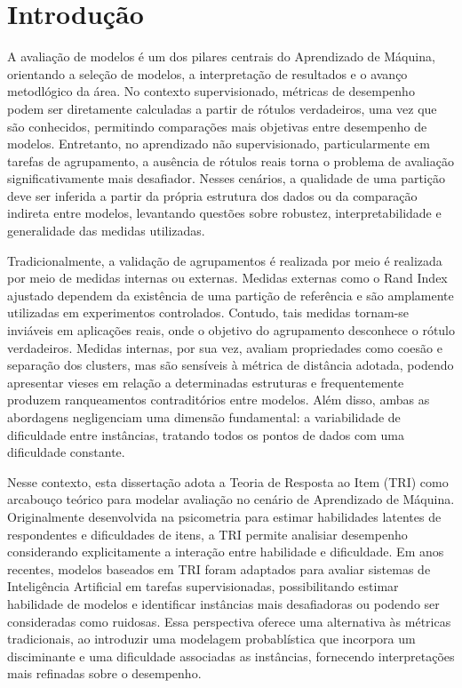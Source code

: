 \chapter{Introdução}

A avaliação de modelos é um dos pilares centrais do Aprendizado de Máquina, orientando a seleção de modelos, a interpretação de resultados e o avanço metodlógico da área. No contexto supervisionado, métricas de desempenho podem ser diretamente calculadas a partir de rótulos verdadeiros, uma vez que são conhecidos, permitindo comparações mais objetivas entre desempenho de modelos. Entretanto, no aprendizado não supervisionado, particularmente em tarefas de agrupamento, a ausência de rótulos reais torna o problema de avaliação significativamente mais desafiador. Nesses cenários, a qualidade de uma partição deve ser inferida a partir da própria estrutura dos dados ou da comparação indireta entre modelos, levantando questões sobre robustez, interpretabilidade e generalidade das medidas utilizadas.

Tradicionalmente, a validação de agrupamentos é realizada por meio é realizada por meio de medidas internas ou externas. Medidas externas como o Rand Index ajustado dependem da existência de uma partição de referência e são amplamente utilizadas em experimentos controlados. Contudo, tais medidas tornam-se inviáveis em aplicações reais, onde o objetivo do agrupamento desconhece o rótulo verdadeiros. Medidas internas, por sua vez, avaliam propriedades como coesão e separação dos clusters, mas são sensíveis à métrica de distância adotada, podendo apresentar vieses em relação a determinadas estruturas e frequentemente produzem ranqueamentos contraditórios entre modelos. Além disso, ambas as abordagens negligenciam uma dimensão fundamental: a variabilidade de dificuldade entre instâncias, tratando todos os pontos de dados com uma dificuldade constante.

Nesse contexto, esta dissertação adota a Teoria de Resposta ao Item (TRI) como arcabouço teórico para modelar avaliação no cenário de Aprendizado de Máquina. Originalmente desenvolvida na psicometria para estimar habilidades latentes de respondentes e dificuldades de itens, a TRI permite analisiar desempenho considerando explicitamente a interação entre habilidade e dificuldade. Em anos recentes, modelos baseados em TRI foram adaptados para avaliar sistemas de Inteligência Artificial em tarefas supervisionadas, possibilitando estimar habilidade de modelos e identificar instâncias mais desafiadoras ou podendo ser consideradas como ruidosas. Essa perspectiva oferece uma alternativa às métricas tradicionais, ao introduzir uma modelagem probablística que incorpora um disciminante e uma dificuldade associadas as instâncias, fornecendo interpretações mais refinadas sobre o desempenho.

